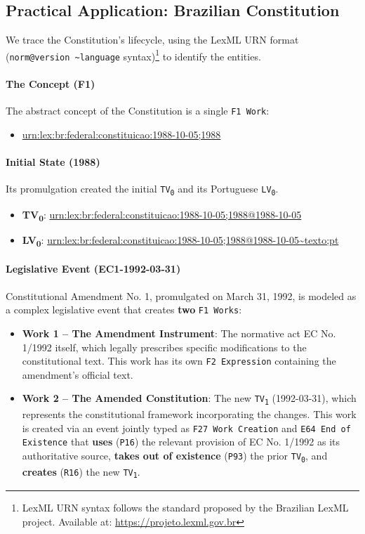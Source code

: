 \documentclass[11pt]{article}
\begin{document}
\subsection{Practical Application: Brazilian Constitution}
We trace the Constitution's lifecycle, using the LexML URN format (\texttt{norm@version \textasciitilde language} syntax)\footnote{LexML URN syntax follows the standard proposed by the Brazilian LexML project. Available at: \url{https://projeto.lexml.gov.br}} to identify the entities.

\paragraph{The Concept (F1)}
The abstract concept of the Constitution is a single \texttt{F1 Work}:
\begin{itemize}
\item \url{urn:lex:br:federal:constituicao:1988-10-05;1988}
\end{itemize}
\paragraph{Initial State (1988)}
Its promulgation created the initial \texttt{TV\textsubscript{0}} and its Portuguese \texttt{LV\textsubscript{0}}.
\begin{itemize}
\item \textbf{TV\textsubscript{0}}: \url{urn:lex:br:federal:constituicao:1988-10-05;1988@1988-10-05}
\item \textbf{LV\textsubscript{0}}: \url{urn:lex:br:federal:constituicao:1988-10-05;1988@1988-10-05~texto;pt}
\end{itemize}

\paragraph{Legislative Event (EC1-1992-03-31)}
Constitutional Amendment No. 1, promulgated on March 31, 1992, is modeled 
as a complex legislative event that creates \textbf{two} \texttt{F1 Works}:

\begin{itemize}
    \item \textbf{Work 1 -- The Amendment Instrument}: The normative act 
    EC No. 1/1992 itself, which legally prescribes specific modifications 
    to the constitutional text. This work has its own \texttt{F2 Expression} 
    containing the amendment's official text.
    
\item \textbf{Work 2 -- The Amended Constitution}: The new 
    \texttt{TV\textsubscript{1}} (1992-03-31), which represents the 
    constitutional framework incorporating the changes. This work is created 
    via an event jointly typed as \texttt{F27 Work Creation} and 
    \texttt{E64 End of Existence} that \textbf{uses} (\texttt{P16}) the relevant 
    provision of EC No. 1/1992 as its authoritative source, \textbf{takes out of 
    existence} (\texttt{P93}) the prior \texttt{TV\textsubscript{0}}, and 
    \textbf{creates} (\texttt{R16}) the new \texttt{TV\textsubscript{1}}.
\end{itemize}
\end{document}
